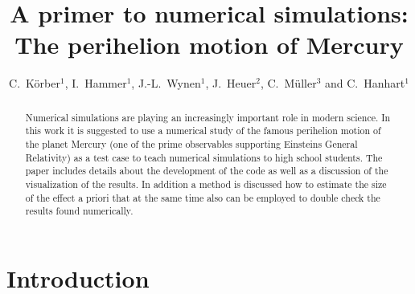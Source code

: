 \documentclass[12pt,ngerman,american]{iopart}
\begin{document}
\title[A primer to numerical simulations]{A primer to numerical simulations: The perihelion motion of Mercury}

\author{
	C.~K\"orber$^{1}$,
	I.~Hammer$^{1}$,
	J.-L.~Wynen$^{1}$,
	J.~Heuer$^{2}$,
	C.~M\"uller$^{3}$ and
	C.~Hanhart$^{1}$
}
\address{
	$^1$ \textit{Institute f\"ur Kernphysik (IKP-3) and Institute for Advanced Simulations (IAS-4), Forschungszentrum J\"ulich, D-52425 J\"ulich, Germany}\\
	$^2$ \textit{Institut f\"ur Neurowissenschaften und Medizin (INM-4), Forschungszentrum J\"ulich, D-52425 J\"ulich, Germany}\\
	$^3$ \textit{JuLab, Forschungszentrum J\"ulich, D-52425 J\"ulich, Germany}
}
\vspace{10pt}

\begin{abstract}
Numerical simulations are playing an increasingly important role in modern science.
In this work it is suggested to use a numerical study of the famous perihelion motion of the planet Mercury (one of the prime observables supporting Einsteins General Relativity) as a test case to teach numerical simulations to high school students.
The paper includes details about the development of the code as well as a discussion of the visualization of the results.
In addition a method is discussed how to estimate the size of the effect a priori that at the same time also can be employed to
double check the results found numerically.
\end{abstract}

%
%
%
% 
%

\section{Introduction}\label{sec:intro}
\end{document}
